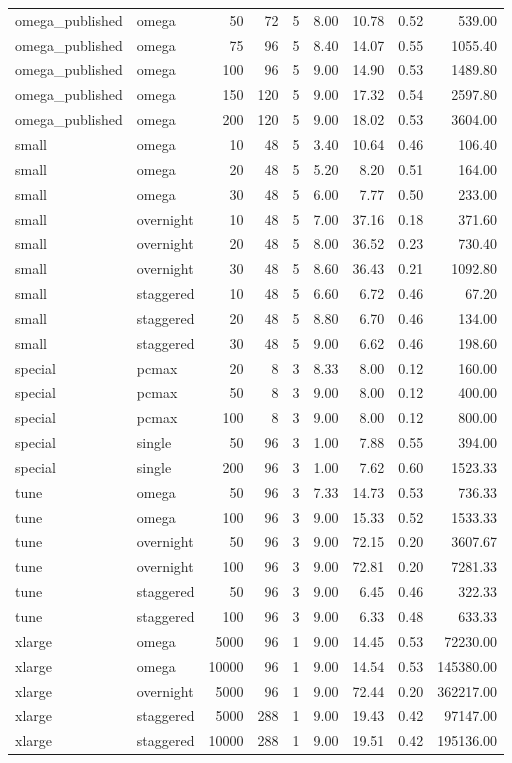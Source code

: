 \begin{table}[htbp]
\begin{tabular}{llrrrrrrr}
omega\_published & omega & 50 & 72 & 5 & 8.00 & 10.78 & 0.52 & 539.00 \\
omega\_published & omega & 75 & 96 & 5 & 8.40 & 14.07 & 0.55 & 1055.40 \\
omega\_published & omega & 100 & 96 & 5 & 9.00 & 14.90 & 0.53 & 1489.80 \\
omega\_published & omega & 150 & 120 & 5 & 9.00 & 17.32 & 0.54 & 2597.80 \\
omega\_published & omega & 200 & 120 & 5 & 9.00 & 18.02 & 0.53 & 3604.00 \\
small & omega & 10 & 48 & 5 & 3.40 & 10.64 & 0.46 & 106.40 \\
small & omega & 20 & 48 & 5 & 5.20 & 8.20 & 0.51 & 164.00 \\
small & omega & 30 & 48 & 5 & 6.00 & 7.77 & 0.50 & 233.00 \\
small & overnight & 10 & 48 & 5 & 7.00 & 37.16 & 0.18 & 371.60 \\
small & overnight & 20 & 48 & 5 & 8.00 & 36.52 & 0.23 & 730.40 \\
small & overnight & 30 & 48 & 5 & 8.60 & 36.43 & 0.21 & 1092.80 \\
small & staggered & 10 & 48 & 5 & 6.60 & 6.72 & 0.46 & 67.20 \\
small & staggered & 20 & 48 & 5 & 8.80 & 6.70 & 0.46 & 134.00 \\
small & staggered & 30 & 48 & 5 & 9.00 & 6.62 & 0.46 & 198.60 \\
special & pcmax & 20 & 8 & 3 & 8.33 & 8.00 & 0.12 & 160.00 \\
special & pcmax & 50 & 8 & 3 & 9.00 & 8.00 & 0.12 & 400.00 \\
special & pcmax & 100 & 8 & 3 & 9.00 & 8.00 & 0.12 & 800.00 \\
special & single & 50 & 96 & 3 & 1.00 & 7.88 & 0.55 & 394.00 \\
special & single & 200 & 96 & 3 & 1.00 & 7.62 & 0.60 & 1523.33 \\
tune & omega & 50 & 96 & 3 & 7.33 & 14.73 & 0.53 & 736.33 \\
tune & omega & 100 & 96 & 3 & 9.00 & 15.33 & 0.52 & 1533.33 \\
tune & overnight & 50 & 96 & 3 & 9.00 & 72.15 & 0.20 & 3607.67 \\
tune & overnight & 100 & 96 & 3 & 9.00 & 72.81 & 0.20 & 7281.33 \\
tune & staggered & 50 & 96 & 3 & 9.00 & 6.45 & 0.46 & 322.33 \\
tune & staggered & 100 & 96 & 3 & 9.00 & 6.33 & 0.48 & 633.33 \\
xlarge & omega & 5000 & 96 & 1 & 9.00 & 14.45 & 0.53 & 72230.00 \\
xlarge & omega & 10000 & 96 & 1 & 9.00 & 14.54 & 0.53 & 145380.00 \\
xlarge & overnight & 5000 & 96 & 1 & 9.00 & 72.44 & 0.20 & 362217.00 \\
xlarge & staggered & 5000 & 288 & 1 & 9.00 & 19.43 & 0.42 & 97147.00 \\
xlarge & staggered & 10000 & 288 & 1 & 9.00 & 19.51 & 0.42 & 195136.00 \\
\bottomrule
\end{tabular}
\end{table}
